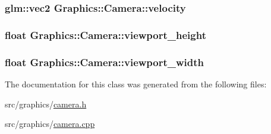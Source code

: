 \subsubsection[{velocity}]{\setlength{\rightskip}{0pt plus 5cm}glm\+::vec2 Graphics\+::\+Camera\+::velocity\hspace{0.3cm}{\ttfamily [private]}}\label{class_graphics_1_1_camera_aefe34c1354a1e2f45db923da5686e1d5}
\hypertarget{class_graphics_1_1_camera_acc8b30298da1779394bbafb91f5a7855}{}
\subsubsection[{viewport\+\_\+height}]{\setlength{\rightskip}{0pt plus 5cm}float Graphics\+::\+Camera\+::viewport\+\_\+height\hspace{0.3cm}{\ttfamily [private]}}\label{class_graphics_1_1_camera_acc8b30298da1779394bbafb91f5a7855}
\hypertarget{class_graphics_1_1_camera_ae08e862d5cf284a8d28a5b5bebdf1d33}{}
\subsubsection[{viewport\+\_\+width}]{\setlength{\rightskip}{0pt plus 5cm}float Graphics\+::\+Camera\+::viewport\+\_\+width\hspace{0.3cm}{\ttfamily [private]}}\label{class_graphics_1_1_camera_ae08e862d5cf284a8d28a5b5bebdf1d33}


The documentation for this class was generated from the following files\+:\begin{DoxyCompactItemize}
\item 
src/graphics/\hyperlink{camera_8h}{camera.\+h}\item 
src/graphics/\hyperlink{camera_8cpp}{camera.\+cpp}\end{DoxyCompactItemize}
